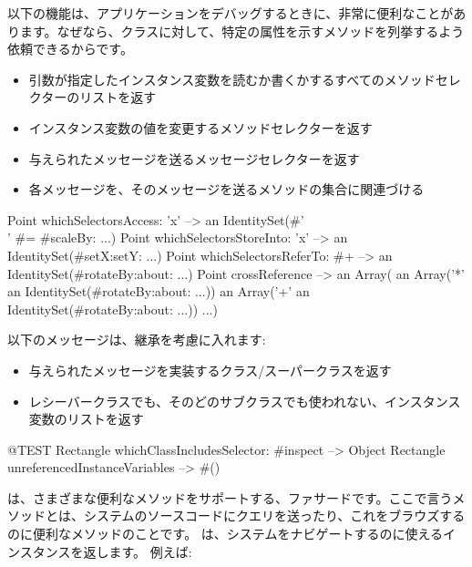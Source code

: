 \documentclass[a4paper,10pt,twoside]{book}
\begin{document}
以下の機能は、アプリケーションをデバッグするときに、非常に便利なことがあります。なぜなら、クラスに対して、特定の属性を示すメソッドを列挙するよう依頼できるからです。 %
\begin{itemize}
\item {} 引数が指定したインスタンス変数を読むか書くかするすべてのメソッドセレクターのリストを返す %
\item {} インスタンス変数の値を変更するメソッドセレクターを返す
\item {} 与えられたメッセージを送るメッセージセレクターを返す
\item {} 各メッセージを、そのメッセージを送るメソッドの集合に関連づける %
\end{itemize}

\begin{code}{} %
Point whichSelectorsAccess: 'x'    --> an IdentitySet(#'\\' #= #scaleBy: ...)
Point whichSelectorsStoreInto: 'x' --> an IdentitySet(#setX:setY: ...)
Point whichSelectorsReferTo: #+  --> an IdentitySet(#rotateBy:about: ...)
Point crossReference --> an Array(
		an Array('*' an IdentitySet(#rotateBy:about: ...))
		an Array('+' an IdentitySet(#rotateBy:about: ...))
		...)
\end{code}

以下のメッセージは、継承を考慮に入れます:
\begin{itemize}
\item {} 与えられたメッセージを実装するクラス/スーパークラスを返す %
\item {}レシーバークラスでも、そのどのサブクラスでも使われない、インスタンス変数のリストを返す
\end{itemize}

\begin{code}{@TEST}
Rectangle whichClassIncludesSelector: #inspect --> Object
Rectangle unreferencedInstanceVariables            --> #()
\end{code}

は、さまざまな便利なメソッドをサポートする、ファサードです。ここで言うメソッドとは、システムのソースコードにクエリを送ったり、これをブラウズするのに便利なメソッドのことです。
 は、システムをナビゲートするのに使えるインスタンスを返します。
例えば:
\end{document}

